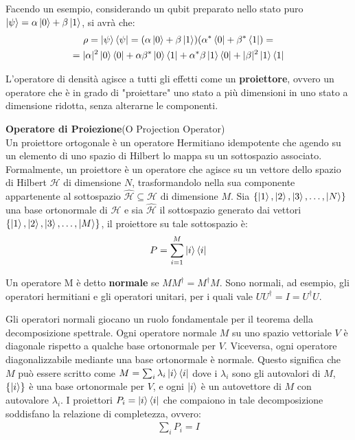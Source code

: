 Facendo un esempio, considerando un qubit preparato nello stato puro \(\ket{\psi} = \alpha \ket{0} + \beta \ket{1}\), si avrà che:
\begin{gather*}
\rho = \ket{\psi}\bra{\psi}=(\alpha \ket{0} + \beta \ket{1})(\alpha^* \bra{0} + \beta^* \bra{1})=\\
= |\alpha|^2 \ket{0}\bra{0} + \alpha \beta^* \ket{0}\bra{1} + \alpha^* \beta \ket{1}\bra{0} + |\beta|^2 \ket{1}\bra{1}
\end{gather*}

L'operatore di densità agisce a tutti gli effetti come un \textbf{proiettore}, ovvero un operatore che è in grado di "proiettare" uno stato a più dimensioni in uno stato a dimensione ridotta, senza alterarne le componenti.

\begin{info}
\textbf{Operatore di Proiezione}(O Projection Operator)\\
Un proiettore ortogonale è un operatore Hermitiano idempotente che agendo su un elemento di uno spazio di Hilbert lo mappa su un sottospazio associato.
Formalmente, un proiettore è un operatore che agisce su un vettore dello spazio di Hilbert \(\mathcal{H}\) di dimensione \(N\), trasformandolo nella sua componente appartenente al sottospazio \(\hat{\mathcal{H}} \subseteq \mathcal{H}\) di dimensione \(M\). Sia \(\{\ket{1},\ket{2},\ket{3},\dots, \ket{N}\}\) una base ortonormale di \(\mathcal{H}\) e sia \(\hat{\mathcal{H}}\) il sottospazio generato dai vettori \(\{\ket{1}, \ket{2}, \ket{3}, \dots, \ket{M}\}\), il proiettore su tale sottospazio è:
\begin{gather*}
P=\sum_{i=1}^{M}\ket{i}\bra{i}
\end{gather*}

Un operatore M è detto \textbf{normale} se \(M M^\dagger = M^\dagger M\). Sono normali, ad esempio, gli operatori hermitiani e gli operatori unitari, per i quali vale \(U U^\dagger = I = U^\dagger U\).

Gli operatori normali giocano un ruolo fondamentale per il teorema della decomposizione spettrale. Ogni operatore normale \(M\) su uno spazio vettoriale \(V\) è diagonale rispetto a qualche base ortonormale per \(V\). Viceversa, ogni operatore diagonalizzabile mediante una base ortonormale è normale. Questo significa che \(M\) può essere scritto come \(M=\sum_{i} \lambda_i \ket{i}\bra{i}\) dove i \(\lambda_i\) sono gli autovalori di \(M\), \(\{\ket{i}\}\) è una base ortonormale per \(V\), e ogni \(\ket{i}\) è un autovettore di \(M\) con autovalore \(\lambda_i\). I proiettori \(P_i=\ket{i}\bra{i}\) che compaiono in tale decomposizione soddisfano la relazione di completezza, ovvero:
\begin{gather*}
\sum_{i} P_i = I
\end{gather*}


\end{info}
